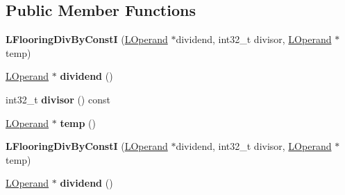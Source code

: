 \subsection*{Public Member Functions}
\begin{DoxyCompactItemize}
\item 
{\bfseries L\+Flooring\+Div\+By\+ConstI} (\hyperlink{classv8_1_1internal_1_1_l_operand}{L\+Operand} $\ast$dividend, int32\+\_\+t divisor, \hyperlink{classv8_1_1internal_1_1_l_operand}{L\+Operand} $\ast$temp)\hypertarget{classv8_1_1internal_1_1_l_flooring_div_by_const_i_ae250f828f1300817ff62968952e8d1bf}{}\label{classv8_1_1internal_1_1_l_flooring_div_by_const_i_ae250f828f1300817ff62968952e8d1bf}

\item 
\hyperlink{classv8_1_1internal_1_1_l_operand}{L\+Operand} $\ast$ {\bfseries dividend} ()\hypertarget{classv8_1_1internal_1_1_l_flooring_div_by_const_i_afd6eec483f06b84f2130f69d1bdb0663}{}\label{classv8_1_1internal_1_1_l_flooring_div_by_const_i_afd6eec483f06b84f2130f69d1bdb0663}

\item 
int32\+\_\+t {\bfseries divisor} () const \hypertarget{classv8_1_1internal_1_1_l_flooring_div_by_const_i_af9d8b07c5bf6feee1c070b62089c5bd2}{}\label{classv8_1_1internal_1_1_l_flooring_div_by_const_i_af9d8b07c5bf6feee1c070b62089c5bd2}

\item 
\hyperlink{classv8_1_1internal_1_1_l_operand}{L\+Operand} $\ast$ {\bfseries temp} ()\hypertarget{classv8_1_1internal_1_1_l_flooring_div_by_const_i_afcfe0e19c33badfb035d72c047c00aa7}{}\label{classv8_1_1internal_1_1_l_flooring_div_by_const_i_afcfe0e19c33badfb035d72c047c00aa7}

\item 
{\bfseries L\+Flooring\+Div\+By\+ConstI} (\hyperlink{classv8_1_1internal_1_1_l_operand}{L\+Operand} $\ast$dividend, int32\+\_\+t divisor, \hyperlink{classv8_1_1internal_1_1_l_operand}{L\+Operand} $\ast$temp)\hypertarget{classv8_1_1internal_1_1_l_flooring_div_by_const_i_ae250f828f1300817ff62968952e8d1bf}{}\label{classv8_1_1internal_1_1_l_flooring_div_by_const_i_ae250f828f1300817ff62968952e8d1bf}

\item 
\hyperlink{classv8_1_1internal_1_1_l_operand}{L\+Operand} $\ast$ {\bfseries dividend} ()\hypertarget{classv8_1_1internal_1_1_l_flooring_div_by_const_i_afd6eec483f06b84f2130f69d1bdb0663}{}\label{classv8_1_1internal_1_1_l_flooring_div_by_const_i_afd6eec483f06b84f2130f69d1bdb0663}


\end{DoxyCompactItemize}

